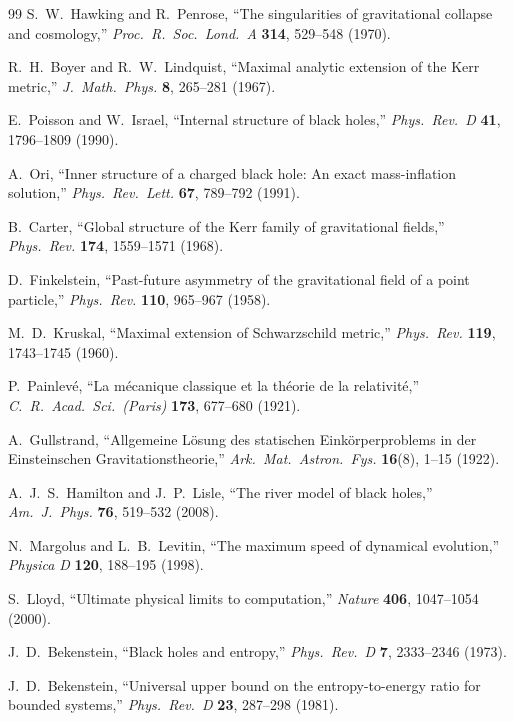 \documentclass[11pt,a4paper]{article}
\theoremstyle{plain}
\theoremstyle{definition}
\theoremstyle{remark}
\numberwithin{equation}{section}
\begin{document}
\begin{thebibliography}{99}
S.~W.~Hawking and R.~Penrose, ``The singularities of gravitational collapse and cosmology,'' \textit{Proc.\ R.\ Soc.\ Lond.\ A} \textbf{314}, 529--548 (1970).

R.~H.~Boyer and R.~W.~Lindquist, ``Maximal analytic extension of the Kerr metric,'' \textit{J.\ Math.\ Phys.} \textbf{8}, 265--281 (1967).

E.~Poisson and W.~Israel, ``Internal structure of black holes,'' \textit{Phys.\ Rev.\ D} \textbf{41}, 1796--1809 (1990).

A.~Ori, ``Inner structure of a charged black hole: An exact mass-inflation solution,'' \textit{Phys.\ Rev.\ Lett.} \textbf{67}, 789--792 (1991).

B.~Carter, ``Global structure of the Kerr family of gravitational fields,'' \textit{Phys.\ Rev.} \textbf{174}, 1559--1571 (1968).

D.~Finkelstein, ``Past-future asymmetry of the gravitational field of a point particle,'' \textit{Phys.\ Rev.} \textbf{110}, 965--967 (1958).

M.~D.~Kruskal, ``Maximal extension of Schwarzschild metric,'' \textit{Phys.\ Rev.} \textbf{119}, 1743--1745 (1960).

P.~Painlev\'e, ``La m\'ecanique classique et la th\'eorie de la relativit\'e,'' \textit{C.\ R.\ Acad.\ Sci.\ (Paris)} \textbf{173}, 677--680 (1921).

A.~Gullstrand, ``Allgemeine L\"osung des statischen Eink\"orperproblems in der Einsteinschen Gravitationstheorie,'' \textit{Ark.\ Mat.\ Astron.\ Fys.} \textbf{16}(8), 1--15 (1922).

A.~J.~S.~Hamilton and J.~P.~Lisle, ``The river model of black holes,'' \textit{Am.\ J.\ Phys.} \textbf{76}, 519--532 (2008).

N.~Margolus and L.~B.~Levitin, ``The maximum speed of dynamical evolution,'' \textit{Physica D} \textbf{120}, 188--195 (1998).

S.~Lloyd, ``Ultimate physical limits to computation,'' \textit{Nature} \textbf{406}, 1047--1054 (2000).

J.~D.~Bekenstein, ``Black holes and entropy,'' \textit{Phys.\ Rev.\ D} \textbf{7}, 2333--2346 (1973).

J.~D.~Bekenstein, ``Universal upper bound on the entropy-to-energy ratio for bounded systems,'' \textit{Phys.\ Rev.\ D} \textbf{23}, 287--298 (1981).


\end{thebibliography}
\end{document}
